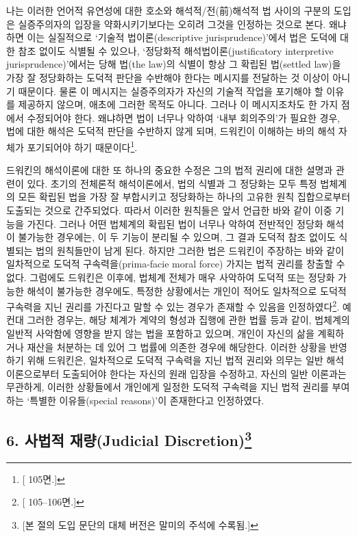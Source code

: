 나는 이러한 언어적 유연성에 대한 호소와 해석적/전(前)해석적 법 사이의
구분의 도입은 실증주의자의 입장을 약화시키기보다는 오히려 그것을
인정하는 것으로 본다. 왜냐하면 이는 실질적으로 `기술적
법이론(descriptive jurisprudence)'에서 법은 도덕에 대한 참조 없이도
식별될 수 있으나, `정당화적 해석법이론(justificatory interpretive
jurisprudence)'에서는 당해 법(the law)의 식별이 항상 그 확립된
법(settled law)을 가장 잘 정당화하는 도덕적 판단을 수반해야 한다는
메시지를 전달하는 것 이상이 아니기 때문이다. 물론 이 메시지는
실증주의자가 자신의 기술적 작업을 포기해야 할 이유를 제공하지 않으며,
애초에 그러한 목적도 아니다. 그러나 이 메시지조차도 한 가지 점에서
수정되어야 한다. 왜냐하면 법이 너무나 악하여 `내부 회의주의'가 필요한
경우, 법에 대한 해석은 도덕적 판단을 수반하지 않게 되며, 드워킨이
이해하는 바의 해석 자체가 포기되어야 하기 때문이다\footnote{{[}
  105면.{]}}.

드워킨의 해석이론에 대한 또 하나의 중요한 수정은 그의 법적 권리에 대한
설명과 관련이 있다. 초기의 전체론적 해석이론에서, 법의 식별과 그
정당화는 모두 특정 법체계의 모든 확립된 법을 가장 잘 부합시키고
정당화하는 하나의 고유한 원칙 집합으로부터 도출되는 것으로 간주되었다.
따라서 이러한 원칙들은 앞서 언급한 바와 같이 이중 기능을 가진다. 그러나
어떤 법체계의 확립된 법이 너무나 악하여 전반적인 정당화 해석이 불가능한
경우에는, 이 두 기능이 분리될 수 있으며, 그 결과 도덕적 참조 없이도
식별되는 법의 원칙들만이 남게 된다. 하지만 그러한 법은 드워킨이 주장하는
바와 같이 일차적으로 도덕적 구속력을(prima-facie moral force) 가지는
법적 권리를 창출할 수 없다. 그럼에도 드워킨은 이후에, 법체계 전체가 매우
사악하여 도덕적 또는 정당화 가능한 해석이 불가능한 경우에도, 특정한
상황에서는 개인이 적어도 일차적으로 도덕적 구속력을 지닌 권리를 가진다고
말할 수 있는 경우가 존재할 수 있음을 인정하였다\footnote{{[}
  105--106면.{]}}. 예컨대 그러한 경우는, 해당 체계가 계약의 형성과
집행에 관한 법률 등과 같이, 법체계의 일반적 사악함에 영향을 받지 않는
법을 포함하고 있으며, 개인이 자신의 삶을 계획하거나 재산을 처분하는 데
있어 그 법률에 의존한 경우에 해당한다. 이러한 상황을 반영하기 위해
드워킨은, 일차적으로 도덕적 구속력을 지닌 법적 권리와 의무는 일반
해석이론으로부터 도출되어야 한다는 자신의 원래 입장을 수정하고, 자신의
일반 이론과는 무관하게, 이러한 상황들에서 개인에게 일정한 도덕적
구속력을 지닌 법적 권리를 부여하는 `특별한 이유들(special reasons)'이
존재한다고 인정하였다.

\subsection[6. 사법적 재량(Judicial Discretion)]{\texorpdfstring{6.
사법적 재량(Judicial
Discretion)\footnote{{[}본 절의 도입 문단의 대체 버전은 말미의 주석에
  수록됨.{]}}}{6. 사법적 재량(Judicial Discretion)}}\label{uxc0acuxbc95uxc801-uxc7acuxb7c9judicial-discretion73}

